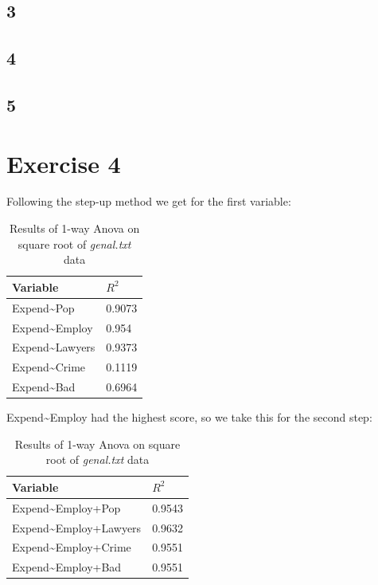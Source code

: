 \documentclass{article}
\begin{document}
    \subsection*{3}
    \subsection*{4}
    \subsection*{5}

  \section*{Exercise 4}
    Following the step-up method we get for the first variable:
    \begin{table}[H]
    \begin{center}
    \begin{tabular}{l|l}
        Variable & $R^2$ \\
        \hline 
        Expend\textasciitilde Pop & 0.9073 \\
        Expend\textasciitilde Employ & 0.954 \\
        Expend\textasciitilde Lawyers & 0.9373 \\
        Expend\textasciitilde Crime & 0.1119 \\
        Expend\textasciitilde Bad & 0.6964 \\
    \end{tabular}
    \caption{Results of 1-way Anova on square root of \textit{genal.txt} data}
    \label{table:step1}
    \end{center}
    \end{table}
    Expend\textasciitilde Employ had the highest score, so we take this for the second step:
    \begin{table}[H]
    \begin{center}
    \begin{tabular}{l|l}
        Variable & $R^2$ \\
        \hline 
        Expend\textasciitilde Employ+Pop & 0.9543 \\
        Expend\textasciitilde Employ+Lawyers & 0.9632 \\
        Expend\textasciitilde Employ+Crime & 0.9551 \\
        Expend\textasciitilde Employ+Bad & 0.9551 \\
    \end{tabular}
    \caption{Results of 1-way Anova on square root of \textit{genal.txt} data}
    \label{table:step2}
    \end{center}
    \end{table}
\end{document}
